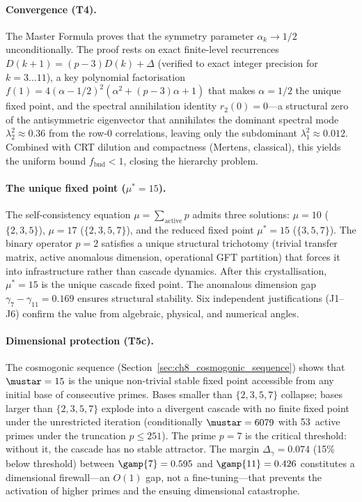 \documentclass[12pt,a4paper]{article}
\begin{document}
\paragraph{Convergence (T4).}
The Master Formula proves that the symmetry parameter
$\alpha_k \to 1/2$ unconditionally.  The proof rests on exact
finite-level recurrences $D(k{+}1) = (p{-}3)D(k) + \Delta$ (verified
to exact integer precision for $k = 3\ldots 11$), a key polynomial
factorisation $f(1) = 4(\alpha - 1/2)^2(\alpha^2 + (p{-}3)\alpha + 1)$
that makes $\alpha = 1/2$ the unique fixed point, and the spectral
annihilation identity $r_2(0) = 0$---a structural zero of the
antisymmetric eigenvector that annihilates the dominant spectral mode
$\lambda_2^2 \approx 0.36$ from the row-0 correlations, leaving only
the subdominant $\lambda_1^2 \approx 0.012$.  Combined with CRT
dilution and compactness (Mertens, classical), this yields the uniform
bound $f_{\mathrm{bnd}} < 1$, closing the hierarchy problem.

\paragraph{The unique fixed point ($\mu^* = 15$).}
The self-consistency equation $\mu = \sum_{\text{active}} p$ admits
three solutions: $\mu = 10$ ($\{2,3,5\}$), $\mu = 17$
($\{2,3,5,7\}$), and the reduced fixed point $\mu^* = 15$
($\{3,5,7\}$).  The binary operator $p = 2$ satisfies a unique
structural trichotomy (trivial transfer matrix, active anomalous
dimension, operational GFT partition) that forces it into
infrastructure rather than cascade dynamics.  After this
crystallisation, $\mu^* = 15$ is the unique cascade fixed point.
The anomalous dimension gap $\gamma_7 - \gamma_{11} = 0.169$ ensures
structural stability.  Six independent justifications (J1--J6)
confirm the value from algebraic, physical, and numerical angles.

\paragraph{Dimensional protection (T5c).}
The cosmogonic sequence (Section~\ref{sec:ch8_cosmogonic_sequence})
shows that $\mustar = 15$ is the unique non-trivial stable fixed
point accessible from any initial base of consecutive primes.  Bases
smaller than $\{2,3,5,7\}$ collapse; bases larger than $\{2,3,5,7\}$
explode into a divergent cascade with no finite fixed point under the
unrestricted iteration (conditionally $\mustar = 6079$ with 53~active
primes under the truncation $p \leq 251$).  The prime $p = 7$ is
the critical threshold: without it, the cascade has no stable
attractor.  The margin $\Delta_\gamma = 0.074$ (15\% below threshold)
between $\gamp{7} = 0.595$ and $\gamp{11} = 0.426$ constitutes a
dimensional firewall---an $O(1)$ gap, not a fine-tuning---that
prevents the activation of higher primes and the ensuing dimensional
catastrophe.
\end{document}
